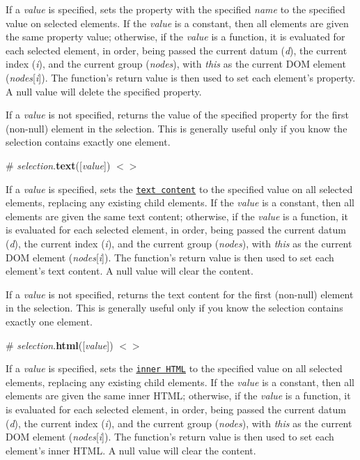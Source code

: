 If a {\itshape value} is specified, sets the property with the specified {\itshape name} to the specified value on selected elements. If the {\itshape value} is a constant, then all elements are given the same property value; otherwise, if the {\itshape value} is a function, it is evaluated for each selected element, in order, being passed the current datum ({\itshape d}), the current index ({\itshape i}), and the current group ({\itshape nodes}), with {\itshape this} as the current D\+OM element ({\itshape nodes}\mbox{[}{\itshape i}\mbox{]}). The function’s return value is then used to set each element’s property. A null value will delete the specified property.

If a {\itshape value} is not specified, returns the value of the specified property for the first (non-\/null) element in the selection. This is generally useful only if you know the selection contains exactly one element.

\label{_selection_text}%
\# {\itshape selection}.{\bfseries text}(\mbox{[}{\itshape value}\mbox{]}) \href{https://github.com/d3/d3-selection/blob/master/src/selection/text.js}{\tt $<$$>$}

If a {\itshape value} is specified, sets the \href{http://www.w3.org/TR/DOM-Level-3-Core/core.html#Node3-textContent}{\tt text content} to the specified value on all selected elements, replacing any existing child elements. If the {\itshape value} is a constant, then all elements are given the same text content; otherwise, if the {\itshape value} is a function, it is evaluated for each selected element, in order, being passed the current datum ({\itshape d}), the current index ({\itshape i}), and the current group ({\itshape nodes}), with {\itshape this} as the current D\+OM element ({\itshape nodes}\mbox{[}{\itshape i}\mbox{]}). The function’s return value is then used to set each element’s text content. A null value will clear the content.

If a {\itshape value} is not specified, returns the text content for the first (non-\/null) element in the selection. This is generally useful only if you know the selection contains exactly one element.

\label{_selection_html}%
\# {\itshape selection}.{\bfseries html}(\mbox{[}{\itshape value}\mbox{]}) \href{https://github.com/d3/d3-selection/blob/master/src/selection/html.js}{\tt $<$$>$}

If a {\itshape value} is specified, sets the \href{http://dev.w3.org/html5/spec-LC/apis-in-html-documents.html#innerhtml}{\tt inner H\+T\+ML} to the specified value on all selected elements, replacing any existing child elements. If the {\itshape value} is a constant, then all elements are given the same inner H\+T\+ML; otherwise, if the {\itshape value} is a function, it is evaluated for each selected element, in order, being passed the current datum ({\itshape d}), the current index ({\itshape i}), and the current group ({\itshape nodes}), with {\itshape this} as the current D\+OM element ({\itshape nodes}\mbox{[}{\itshape i}\mbox{]}). The function’s return value is then used to set each element’s inner H\+T\+ML. A null value will clear the content.

